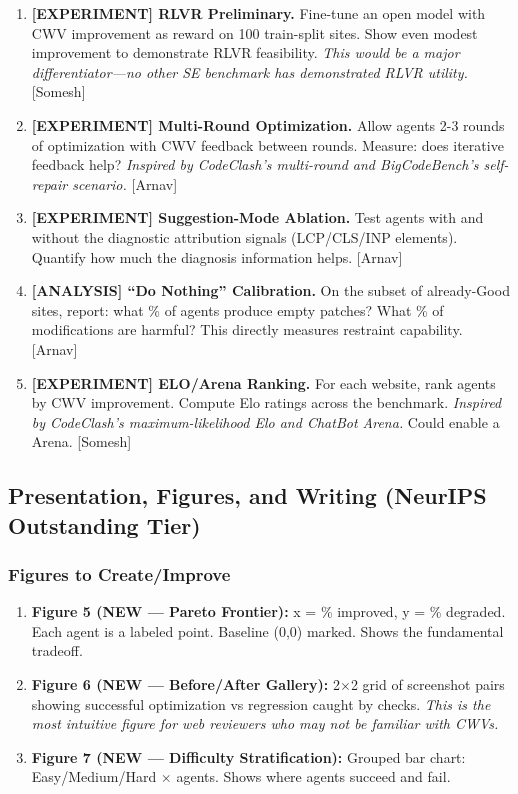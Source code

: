 \begin{enumerate}
    \item \textbf{[EXPERIMENT] RLVR Preliminary.} Fine-tune an open model with CWV improvement as reward on 100 train-split sites. Show even modest improvement to demonstrate RLVR feasibility. \textit{This would be a major differentiator---no other SE benchmark has demonstrated RLVR utility.} [Somesh]

    \item \textbf{[EXPERIMENT] Multi-Round Optimization.} Allow agents 2-3 rounds of optimization with CWV feedback between rounds. Measure: does iterative feedback help? \textit{Inspired by CodeClash's multi-round and BigCodeBench's self-repair scenario.} [Arnav]

    \item \textbf{[EXPERIMENT] Suggestion-Mode Ablation.} Test agents with and without the diagnostic attribution signals (LCP/CLS/INP elements). Quantify how much the diagnosis information helps. [Arnav]

    \item \textbf{[ANALYSIS] ``Do Nothing'' Calibration.} On the subset of already-Good sites, report: what \% of agents produce empty patches? What \% of modifications are harmful? This directly measures restraint capability. [Arnav]

    \item \textbf{[EXPERIMENT] ELO/Arena Ranking.} For each website, rank agents by CWV improvement. Compute Elo ratings across the benchmark. \textit{Inspired by CodeClash's maximum-likelihood Elo and ChatBot Arena.} Could enable a \OurBench Arena. [Somesh]
\end{enumerate}

\subsection{Presentation, Figures, and Writing (NeurIPS Outstanding Tier)}
\subsubsection{Figures to Create/Improve}

\begin{enumerate}
    \item \textbf{Figure 5 (NEW --- Pareto Frontier):} x = \% improved, y = \% degraded. Each agent is a labeled point. Baseline (0,0) marked. Shows the fundamental tradeoff.

    \item \textbf{Figure 6 (NEW --- Before/After Gallery):} 2$\times$2 grid of screenshot pairs showing successful optimization vs regression caught by checks. \textit{This is the most intuitive figure for web reviewers who may not be familiar with CWVs.}

    \item \textbf{Figure 7 (NEW --- Difficulty Stratification):} Grouped bar chart: Easy/Medium/Hard $\times$ agents. Shows where agents succeed and fail.
\end{enumerate}


